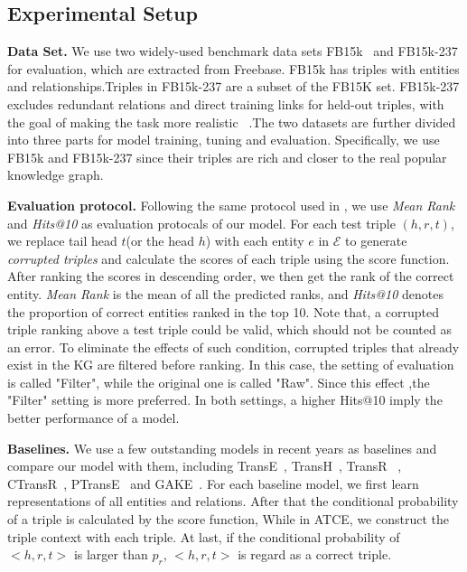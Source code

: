 \subsection{Experimental Setup}

\textbf{\indent Data Set.}
We use two widely-used benchmark data sets FB15k~\cite{BordesUGWY13} and FB15k-237 for evaluation, which are extracted from Freebase. FB15k has triples with entities and relationships.Triples in FB15k-237 are a subset of the FB15K set. FB15k-237 excludes redundant relations and direct training links for held-out triples, with the goal of making the task more realistic ~\cite{Toutanova15}.The two datasets are further divided into three parts for model training, tuning and evaluation. Specifically, we use FB15k and FB15k-237 since their triples are rich and closer to the real popular knowledge graph.

\textbf{Evaluation protocol.}
Following the same protocol used in \cite{BordesUGWY13}, we use \textit{Mean Rank} and \textit{Hits@10} as evaluation protocals of our model. For each test triple $(h,r,t)$, we replace tail head $t$(or the head $h$) with each entity $e$ in $\mathcal{E}$ to generate \emph{corrupted triples} and calculate the scores of each triple using the score function. After ranking the scores in descending order, we then get the rank of the correct entity. \textit{Mean Rank} is the mean of all the predicted ranks, and \textit{Hits@10} denotes the proportion of correct entities ranked in the top 10. Note that, a corrupted triple ranking above a test triple could be valid, which should not be counted as an error. To eliminate the effects of such condition, corrupted triples that already exist in the KG are filtered before ranking. In this case, the setting of evaluation is called "Filter", while the original one is called "Raw". Since this effect ,the "Filter" setting is more preferred. In both settings, a higher Hits@10 imply the better performance of a model.

\textbf{Baselines.}
We use a few outstanding models in recent years as baselines and compare our model with them, including TransE~\cite{BordesUGWY13}, TransH~\cite{WangZFC14}, TransR~\cite{LinLSLZ15} , CTransR~\cite{LinLSLZ15}, PTransE~\cite{LinLLSRL15} and GAKE~\cite{FengHYZ16}. For each baseline model, we first learn representations of all entities and relations. After that the conditional probability of a triple is calculated by the score function, While in ATCE, we construct the triple context with each triple. At last, if the conditional probability of $<h,r,t>$ is larger than $p_r$,  $<h,r,t>$ is regard as a correct triple.

